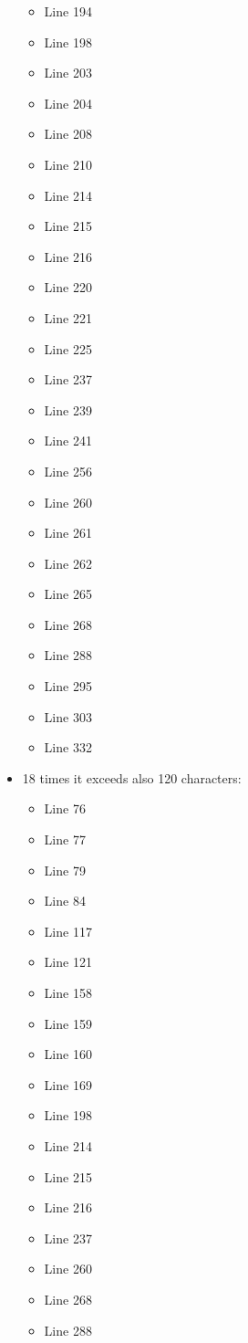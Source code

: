 \begin{itemize}
\begin{itemize}
\item Line 194
\item Line 198
\item Line 203
\item Line 204
\item Line 208  
\item Line 210
\item Line 214
\item Line 215
\item Line 216
\item Line 220
\item Line 221
\item Line 225
\item Line 237
\item Line 239
\item Line 241
\item Line 256
\item Line 260
\item Line 261
\item Line 262
\item Line 265
\item Line 268
\item Line 288
\item Line 295
\item Line 303
\item Line 332 
\end{itemize}

\item 18 times it exceeds also 120 characters:
\begin{itemize}
\item Line 76
\item Line 77
\item Line 79
\item Line 84
\item Line 117
\item Line 121
\item Line 158
\item Line 159
\item Line 160
\item Line 169
\item Line 198
\item Line 214
\item Line 215
\item Line 216
\item Line 237
\item Line 260
\item Line 268
\item Line 288
\end{itemize}
\end{itemize}

